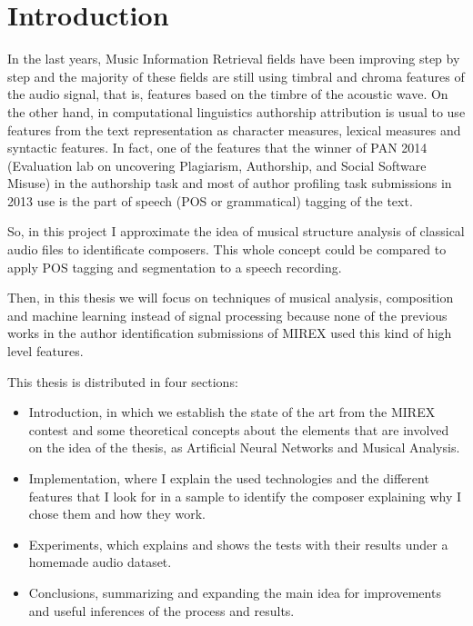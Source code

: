 \documentclass[a4paper,openany,oneside,12pt]{book}
\begin{document}
\cleardoublepage
{}
\listoftables


\newpage
\thispagestyle{empty}
\mbox{}
\setlength{\parskip}{\baselineskip}




\chapter{Introduction}
In the last years, Music Information Retrieval fields have been improving step by step and the majority of these fields are still using timbral and chroma features of the audio signal, that is, features based on the timbre of the acoustic wave. On the other hand, in computational linguistics authorship attribution is usual to use features from the text representation as character measures, lexical measures and syntactic features. In fact, one of the features that the winner of PAN 2014 (Evaluation lab on uncovering Plagiarism, Authorship, and Social Software Misuse) in the authorship task\cite{pan14} and most of author profiling task submissions in 2013\cite{pan13} use is the part of speech (POS or grammatical) tagging of the text.

So, in this project I approximate the idea of musical structure analysis of classical audio files to identificate composers. This whole concept could be compared to apply POS tagging and segmentation to a speech recording.

Then, in this thesis we will focus on techniques of musical analysis, composition and machine learning instead of signal processing because none of the previous works in the author identification submissions of MIREX used this kind of high level features.

This thesis is distributed in four sections:
\begin{itemize}
\item Introduction, in which we establish the state of the art from the MIREX contest and some theoretical concepts about the elements that are involved on the idea of the thesis, as Artificial Neural Networks and Musical Analysis.
\item Implementation, where I explain the used technologies and the different features that I look for in a sample to identify the composer explaining why I chose them and how they work.
\item Experiments, which explains and shows the tests with their results under a homemade audio dataset.
\item Conclusions, summarizing and expanding the main idea for improvements and useful inferences of the process and results.
\end{itemize}
\end{document}
